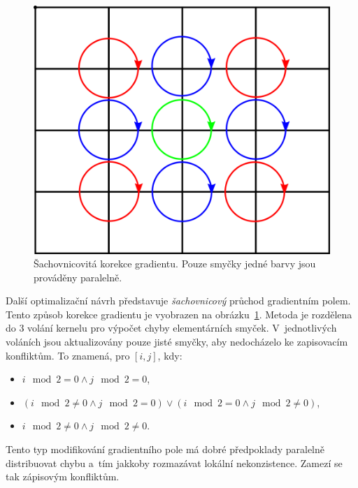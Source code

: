 \documentclass[11pt,a4paper,oneside]{article}
\begin{document}
	\begin{figure}[htb]
		\centering
		\includegraphics[scale=0.3]{fig/chess.png}
		\caption{Šachovnicovitá korekce gradientu. Pouze smyčky jedné barvy jsou prováděny paralelně.}
		\label{fig:chess}
	\end{figure}

	Další optimalizační návrh představuje \emph{šachovnicový} průchod gradientním polem. Tento způsob
	korekce gradientu je vyobrazen na obrázku~\ref{fig:chess}. Metoda je rozdělena do 3 volání kernelu
	pro výpočet chyby elementárních smyček. V~jednotlivých voláních jsou aktualizovány pouze jisté smyčky,
	aby nedocházelo ke zapisovacím konfliktům. To znamená, pro $[i, j]$, kdy:
	\begin{itemize}
		\item $i \mod 2 = 0 \wedge j \mod 2 = 0$,
		\item $(i \mod 2 \neq 0 \wedge j \mod 2 = 0) \lor (i \mod 2 = 0 \wedge j \mod 2 \neq 0)$,
		\item $i \mod 2 \neq 0 \wedge j \mod 2 \neq 0$.
	\end{itemize}
	Tento typ modifikování gradientního pole má dobré předpoklady paralelně distribuovat chybu
	a~tím jakkoby rozmazávat lokální nekonzistence. Zamezí se tak zápisovým konfliktům.
\end{document}
